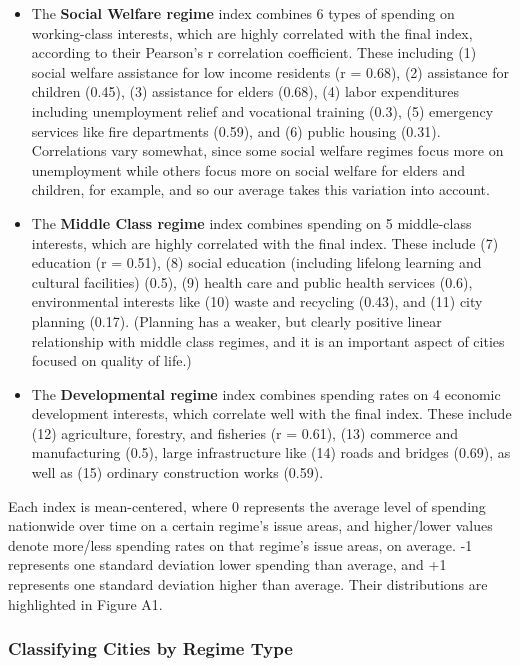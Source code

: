 \documentclass[preprint, 3p,
authoryear]{elsarticle} %
\begin{document}
\begin{itemize}
\item
  The \textbf{Social Welfare regime} index combines 6 types of spending
  on working-class interests, which are highly correlated with the final
  index, according to their Pearson's r correlation coefficient. These
  including (1) social welfare assistance for low income residents (r =
  0.68), (2) assistance for children (0.45), (3) assistance for elders
  (0.68), (4) labor expenditures including unemployment relief and
  vocational training (0.3), (5) emergency services like fire
  departments (0.59), and (6) public housing (0.31). Correlations vary
  somewhat, since some social welfare regimes focus more on unemployment
  while others focus more on social welfare for elders and children, for
  example, and so our average takes this variation into account.
\item
  The \textbf{Middle Class regime} index combines spending on 5
  middle-class interests, which are highly correlated with the final
  index. These include (7) education (r = 0.51), (8) social education
  (including lifelong learning and cultural facilities) (0.5), (9)
  health care and public health services (0.6), environmental interests
  like (10) waste and recycling (0.43), and (11) city planning (0.17).
  (Planning has a weaker, but clearly positive linear relationship with
  middle class regimes, and it is an important aspect of cities focused
  on quality of life.)
\item
  The \textbf{Developmental regime} index combines spending rates on 4
  economic development interests, which correlate well with the final
  index. These include (12) agriculture, forestry, and fisheries (r =
  0.61), (13) commerce and manufacturing (0.5), large infrastructure
  like (14) roads and bridges (0.69), as well as (15) ordinary
  construction works (0.59).
\end{itemize}

Each index is mean-centered, where 0 represents the average level of
spending nationwide over time on a certain regime's issue areas, and
higher/lower values denote more/less spending rates on that regime's
issue areas, on average. -1 represents one standard deviation lower
spending than average, and +1 represents one standard deviation higher
than average. Their distributions are highlighted in Figure A1.

\hypertarget{classifying-cities-by-regime-type}{%
\subsubsection{Classifying Cities by Regime
Type}\label{classifying-cities-by-regime-type}}
\end{document}

